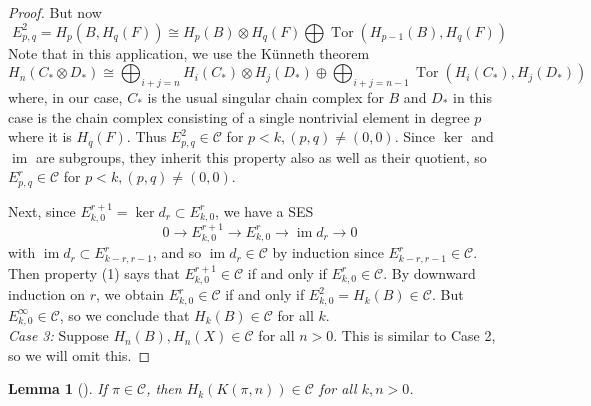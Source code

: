 \documentclass[reqno]{amsart}
\newtheorem{lemma}[theorem]{Lemma}
\theoremstyle{definition}
\theoremstyle{remark}
\DeclareMathOperator{\im}{im}
\DeclareMathOperator{\Tor}{Tor}
\begin{document}
\begin{proof}
    But now
    \[
    E_{p,q}^2 = 
    H_{p}\left( B, H_q(F) \right) 
    \cong
    H_p(B) \otimes H_q(F) \bigoplus
    \Tor \left( H_{p-1}(B), H_q(F) \right) 
    \] 
    Note that in this application, we use the Künneth theorem
    \[
        H_n(C_* \otimes D_*) \cong
        \bigoplus_{i+j=n} H_i(C_*) \otimes
        H_j(D_*) \oplus
        \bigoplus_{i+j=n-1} \Tor (H_i(C_*),
        H_j(D_*))
    \] 
    where, in our case,
    $C_*$ is the usual singular chain complex for
    $B$ and $D_*$ in this case is the chain complex
    consisting of a single
    nontrivial element in degree $p$ where it is
    $H_q(F)$.
    Thus
    $E_{p,q}^2 \in \mathcal{C}$ for
    $p< k, (p,q)\neq (0,0)$. Since
    $\ker$ and $\im$ are subgroups, they inherit
    this property also as well as their quotient,
    so
    $E_{p,q}^{r} \in \mathcal{C}$ for
    $p<k, (p,q)\neq (0,0)$.

    Next, since
    $E_{k,0}^{r+1} = \ker d_r \subset E_{k,0}^{r}$, we have
    a SES
    \[
    0 \to E_{k,0}^{r+1} \to E_{k,0}^{r} \to 
    \im d_r \to 0
    \] 
    with
    $\im d_r \subset E_{k-r,r-1}^{r}$, and so
    $\im d_r \in \mathcal{C}$ by induction since
    $E_{k-r,r-1}^{r} \in \mathcal{C}$. Then property
    (1) says that
    $E_{k,0}^{r+1} \in \mathcal{C}$ if and only if
    $E_{k,0}^{r} \in \mathcal{C}$.
    By downward induction on $r$, we obtain
    $E_{k,0}^{r} \in \mathcal{C}$ if and only if
    $E_{k,0}^2 = H_k(B) \in \mathcal{C}$.
    But $E_{k,0}^{\infty} \in \mathcal{C}$, so
    we conclude that
     $H_k(B) \in \mathcal{C}$ for all $k$.\\
     \linebreak
     \textit{Case 3:} Suppose
     $H_n (B) , H_n(X) \in \mathcal{C}$ for all
     $n>0$. This is similar to Case 2, so
     we will omit this.

\end{proof}


\begin{lemma}[]\label{Lemma:SIDOA2}
    If $\pi \in \mathcal{C}$, then $H_k\left( K
    \left( \pi,n \right) \right) \in \mathcal{C}$ for all
    $k,n>0$.
\end{lemma}
\end{document}
